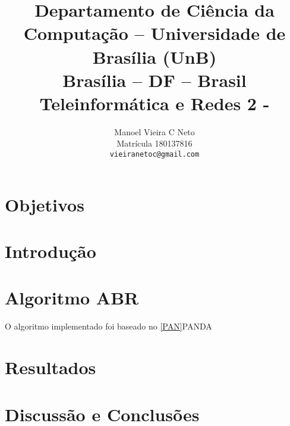 \documentclass[10pt,twocolumn,letterpaper]{article}
\begin{document}
\title{Departamento de Ciência da Computação -- Universidade de Brasília (UnB)\\
  Brasília -- DF -- Brasil\\
  Teleinformática e Redes 2 - \\
}

\author{
Manoel Vieira C Neto\\ 
Matrícula 180137816\\
{\tt\small vieiranetoc@gmail.com}
\and
}
\maketitle

\begin{abstract}
  

\end{abstract}
   
\section{Objetivos}
    
\section{Introdução}

 




\section{Algoritmo ABR}
O algoritmo implementado foi baseado no \ref*{PAN}PANDA

\section{Resultados}


\section{Discussão e Conclusões}

{\small


}
\end{document}

